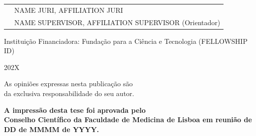 \documentclass[12pt, twoside]{report}
\begin{document}
\begin{titlepage}
\begin{tabular}{@{} l p{13.1cm} }
        & NAME JURI, AFFILIATION JURI \\

        & NAME SUPERVISOR, AFFILIATION SUPERVISOR (Orientador)

    \end{tabular}

    \begin{center}
        Instituição Financiadora:
        Fundação para a Ciência e Tecnologia (FELLOWSHIP ID)
        
        202X
    \end{center}
\end{titlepage}

\begin{titlepage}
    \begin{center}
        \vspace*{\fill}
        As opiniões expressas nesta publicação são\\
        da exclusiva responsabilidade do seu autor. \\
        
        \vspace*{2cm}
        
        \begingroup
            \fontsize{14pt}{12pt}\selectfont
            \textbf{A impressão desta tese foi aprovada pelo\\ Conselho Científico da Faculdade de Medicina de Lisboa em reunião de DD de MMMM de YYYY.}
        \endgroup
    \end{center}
\end{titlepage}


\tableofcontents








\listoffigures
{}

\listoftables
{}



\end{document}
